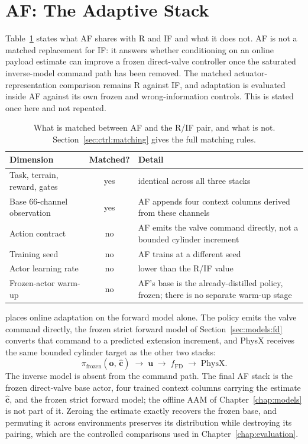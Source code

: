 \section{AF: The Adaptive Stack}
\label{sec:ctrl:ppo-aamfd}

Table~\ref{tab:ctrl:af-matching} states what AF shares with R and IF and what it
does not. AF is not a matched replacement for IF: it answers whether conditioning on an
online payload estimate can improve a frozen direct-valve controller once the
saturated inverse-model command path has been removed. The matched
actuator-representation comparison remains R against IF, and adaptation is
evaluated inside AF against its own frozen and wrong-information controls. This
is stated once here and not repeated.

\begin{table}[H]
  \centering
  \caption{What is matched between AF and the R/IF pair, and what is not.
  Section~\ref{sec:ctrl:matching} gives the full matching rules.}
  \label{tab:ctrl:af-matching}
  \small
  \begin{tabular}{@{}l c p{}@{}}
    \toprule
    Dimension & Matched? & Detail \\
    \midrule
    Task, terrain, reward, gates & yes & identical across all three stacks \\
    Base $66$-channel observation & yes & AF appends four context columns
      derived from these channels \\
    Action contract & no & AF emits the valve command directly, not a
      bounded cylinder increment \\
    Training seed & no & AF trains at a different seed \\
    Actor learning rate & no & lower than the R/IF value \\
    Frozen-actor warm-up & no & AF's base is the already-distilled policy,
      frozen; there is no separate warm-up stage \\
    \bottomrule
  \end{tabular}
\end{table}

\ppoAAMFD{} places online adaptation on the forward model alone. The policy
emits the valve command directly, the frozen strict forward model of
Section~\ref{sec:models:fd} converts that command to a predicted extension
increment, and PhysX receives the same bounded cylinder target as the other two
stacks:
%
\begin{equation}
  \label{eq:ctrl:af-path}
  \pi_{\mathrm{frozen}}(\bm{o},\, \hat{\bm{c}})
  \;\longrightarrow\; \bm{u}
  \;\longrightarrow\; f_{\mathrm{FD}}
  \;\longrightarrow\; \text{PhysX} .
\end{equation}
%
The inverse model is absent from the command path. The final AF stack is the
frozen direct-valve base actor, four trained context columns carrying the
estimate $\hat{\bm{c}}$, and the frozen strict forward model; the offline AAM of
Chapter~\ref{chap:models} is not part of it. Zeroing the estimate exactly
recovers the frozen base, and permuting it across environments preserves its
distribution while destroying its pairing, which are the controlled comparisons
used in Chapter~\ref{chap:evaluation}.


